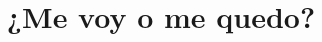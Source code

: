 \documentclass[fontsize=11pt]{scrartcl}
\begin{document}
\title{¿Me voy o me quedo?}
\date{}

\maketitle
\clearpage

\newcommand{\rn}[1]{\Rnode{#1}}
\newcommand{\rl}[2]{\ncline[linestyle=solid,arrows=->,nodesepA=0.5pt,linecolor=gray, strokeopacity=0.5]{#1}{#2}}
\newcommand{\sidenote}[1]{\marginpar[#1]{\small\textit{#1}}}
\newcommand{\ul}[1]{\underline{#1}}
\newcommand{\fillmiss}{\rule{2cm}{0.4pt}~}
\newcommand{\choice}{$\Box$}
\newcommand{\correctchoice}{\framebox[1em]{\ding{51}}}
\newcommand{\falsechoice}{\framebox[1em]{\ding{53}}}
\newcommand{\correction}[1]{~\ding{43}~\textbf{\textsl{#1}}}

\newcommand{\mdash}{-}


\end{document}

